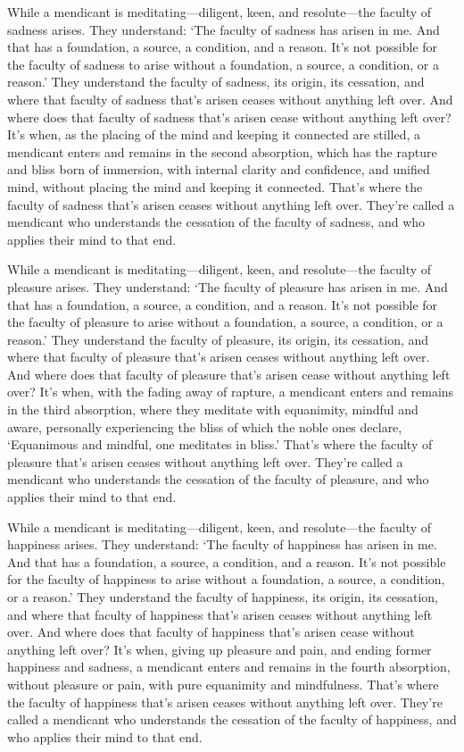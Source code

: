 \documentclass[12pt,openany]{book}%
\begin{document}
While a mendicant is meditating—diligent, keen, and resolute—the faculty of sadness arises. They understand: ‘The faculty of sadness has arisen in me. And that has a foundation, a source, a condition, and a reason. It’s not possible for the faculty of sadness to arise without a foundation, a source, a condition, or a reason.’ They understand the faculty of sadness, its origin, its cessation, and where that faculty of sadness that’s arisen ceases without anything left over. And where does that faculty of sadness that’s arisen cease without anything left over? It’s when, as the placing of the mind and keeping it connected are stilled, a mendicant enters and remains in the second absorption, which has the rapture and bliss born of immersion, with internal clarity and confidence, and unified mind, without placing the mind and keeping it connected. That’s where the faculty of sadness that’s arisen ceases without anything left over. They’re called a mendicant who understands the cessation of the faculty of sadness, and who applies their mind to that end. 

While a mendicant is meditating—diligent, keen, and resolute—the faculty of pleasure arises. They understand: ‘The faculty of pleasure has arisen in me. And that has a foundation, a source, a condition, and a reason. It’s not possible for the faculty of pleasure to arise without a foundation, a source, a condition, or a reason.’ They understand the faculty of pleasure, its origin, its cessation, and where that faculty of pleasure that’s arisen ceases without anything left over. And where does that faculty of pleasure that’s arisen cease without anything left over? It’s when, with the fading away of rapture, a mendicant enters and remains in the third absorption, where they meditate with equanimity, mindful and aware, personally experiencing the bliss of which the noble ones declare, ‘Equanimous and mindful, one meditates in bliss.’ That’s where the faculty of pleasure that’s arisen ceases without anything left over. They’re called a mendicant who understands the cessation of the faculty of pleasure, and who applies their mind to that end. 

While a mendicant is meditating—diligent, keen, and resolute—the faculty of happiness arises. They understand: ‘The faculty of happiness has arisen in me. And that has a foundation, a source, a condition, and a reason. It’s not possible for the faculty of happiness to arise without a foundation, a source, a condition, or a reason.’ They understand the faculty of happiness, its origin, its cessation, and where that faculty of happiness that’s arisen ceases without anything left over. And where does that faculty of happiness that’s arisen cease without anything left over? It’s when, giving up pleasure and pain, and ending former happiness and sadness, a mendicant enters and remains in the fourth absorption, without pleasure or pain, with pure equanimity and mindfulness. That’s where the faculty of happiness that’s arisen ceases without anything left over. They’re called a mendicant who understands the cessation of the faculty of happiness, and who applies their mind to that end. 
\end{document}
